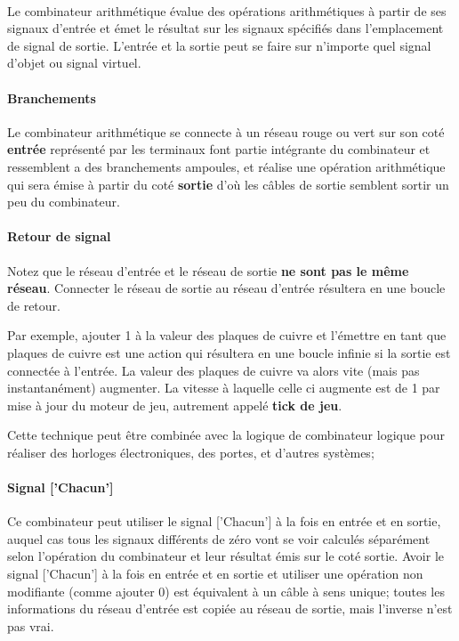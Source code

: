 \documentclass{scrreprt}
\begin{document}
	
	\paragraph{}
	Le combinateur arithmétique évalue des opérations arithmétiques à partir de ses signaux d'entrée et émet le résultat sur les signaux spécifiés dans l'emplacement de signal de sortie. 
	L'entrée et la sortie peut se faire sur n'importe quel signal d'objet ou signal virtuel.
	
	\paragraph{Branchements} 
	Le combinateur arithmétique se connecte à un réseau rouge ou vert sur son coté \textbf{entrée} représenté par les terminaux font partie intégrante du combinateur et ressemblent a des branchements ampoules, et réalise une opération arithmétique qui sera émise à partir du coté \textbf{sortie} d'où les câbles de sortie semblent sortir un peu du combinateur. 
	
	\paragraph{Retour de signal}
	Notez que le réseau d'entrée et le réseau de sortie \textbf{ne sont pas le même réseau}.
	Connecter le réseau de sortie au réseau d'entrée résultera en une boucle de retour. 
	
	Par exemple, ajouter 1 à la valeur des plaques de cuivre et l'émettre en tant que plaques de cuivre est une action qui résultera en une boucle infinie si la sortie est connectée à l'entrée. 
	La valeur des plaques de cuivre va alors vite (mais pas instantanément) augmenter. 
	La vitesse à laquelle celle ci augmente est de 1 par mise à jour du moteur de jeu, autrement appelé \textbf{tick de jeu}. 
	
	Cette technique peut être combinée avec la logique de combinateur logique pour réaliser des horloges électroniques, des portes, et d'autres systèmes;
	
	\paragraph{Signal ['Chacun']}
	Ce combinateur peut utiliser le signal ['Chacun'] à la fois en entrée et en sortie, auquel cas tous les signaux différents de zéro vont se voir calculés séparément selon l'opération du combinateur et leur résultat émis sur le coté sortie.
	Avoir le signal ['Chacun'] à la fois en entrée et en sortie et utiliser une opération non modifiante (comme ajouter 0) est équivalent à un câble à sens unique; toutes les informations du réseau d'entrée est copiée au réseau de sortie, mais l'inverse n'est pas vrai.
	
\end{document}
